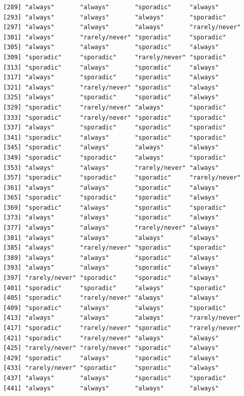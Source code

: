 \documentclass[
  letterpaper,
  DIV=11,
  numbers=noendperiod]{scrartcl}
\begin{document}
\begin{verbatim}
 [289] "always"       "always"       "sporadic"     "always"      
 [293] "always"       "always"       "always"       "sporadic"    
 [297] "always"       "always"       "always"       "rarely/never"
 [301] "always"       "rarely/never" "sporadic"     "sporadic"    
 [305] "always"       "always"       "sporadic"     "always"      
 [309] "sporadic"     "sporadic"     "rarely/never" "sporadic"    
 [313] "sporadic"     "always"       "sporadic"     "always"      
 [317] "always"       "sporadic"     "sporadic"     "always"      
 [321] "always"       "rarely/never" "sporadic"     "always"      
 [325] "always"       "sporadic"     "sporadic"     "always"      
 [329] "sporadic"     "rarely/never" "always"       "sporadic"    
 [333] "sporadic"     "rarely/never" "sporadic"     "sporadic"    
 [337] "always"       "sporadic"     "sporadic"     "sporadic"    
 [341] "sporadic"     "always"       "sporadic"     "sporadic"    
 [345] "sporadic"     "always"       "always"       "always"      
 [349] "sporadic"     "sporadic"     "always"       "sporadic"    
 [353] "always"       "always"       "rarely/never" "always"      
 [357] "sporadic"     "sporadic"     "sporadic"     "rarely/never"
 [361] "always"       "always"       "sporadic"     "always"      
 [365] "sporadic"     "sporadic"     "sporadic"     "always"      
 [369] "sporadic"     "always"       "sporadic"     "sporadic"    
 [373] "always"       "always"       "sporadic"     "always"      
 [377] "always"       "always"       "rarely/never" "always"      
 [381] "always"       "always"       "always"       "always"      
 [385] "always"       "rarely/never" "sporadic"     "sporadic"    
 [389] "always"       "always"       "sporadic"     "always"      
 [393] "always"       "always"       "sporadic"     "always"      
 [397] "rarely/never" "sporadic"     "sporadic"     "always"      
 [401] "sporadic"     "sporadic"     "always"       "sporadic"    
 [405] "sporadic"     "rarely/never" "always"       "always"      
 [409] "sporadic"     "always"       "always"       "sporadic"    
 [413] "always"       "always"       "always"       "rarely/never"
 [417] "sporadic"     "rarely/never" "sporadic"     "rarely/never"
 [421] "sporadic"     "rarely/never" "always"       "always"      
 [425] "rarely/never" "rarely/never" "sporadic"     "always"      
 [429] "sporadic"     "always"       "sporadic"     "always"      
 [433] "rarely/never" "sporadic"     "sporadic"     "always"      
 [437] "always"       "always"       "sporadic"     "sporadic"    
 [441] "always"       "always"       "always"       "always"      

\end{verbatim}
\end{document}
